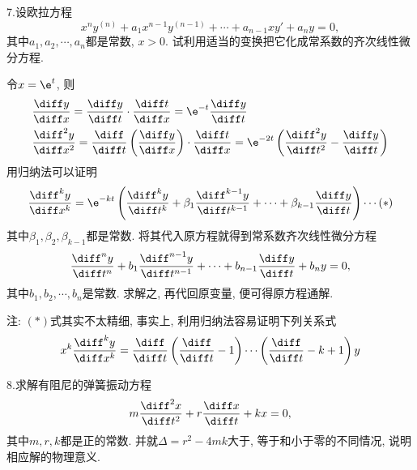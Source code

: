 7.设欧拉方程
\[x^ny^{(n)}+a_1x^{n-1}y^{(n-1)}+\cdots+a_{n-1}xy'+a_ny=0,\]
其中$a_1,a_2,\cdots,a_n$都是常数, $x>0$. 试利用适当的变换把它化成常系数的齐次线性微分方程.

\begin{solve} 
令$x=\e^t$, 则
\[\begin{split}
&\frac{\diff y}{\diff x}=\frac{\diff y}{\diff t}\cdot\frac{\diff t}{\diff x}=\e^{-t}\frac{\diff y}{\diff t}\\
&\frac{\diff^2y}{\diff x^2}=\frac{\diff}{\diff t}\left(\frac{\diff y}{\diff x}\right)\cdot\frac{\diff t}{\diff x}=\e^{-2t}\left(\frac{\diff^2y}{\diff t^2}-\frac{\diff y}{\diff t}\right)
\end{split}\]
用归纳法可以证明
\[\frac{\diff^ky}{\diff x^k}=\e^{-kt}\left(\frac{\diff^ky}{\diff t^k}+\beta_1\frac{\diff^{k-1}y}{\diff t^{k-1}}+\cdots+\beta_{k-1}\frac{\diff y}{\diff t}\right)\cdots(*)\]
其中$\beta_1,\beta_2,\beta_{k-1}$都是常数. 将其代入原方程就得到常系数齐次线性微分方程
\[\frac{\diff^ny}{\diff t^n}+b_1\frac{\diff^{n-1}y}{\diff t^{n-1}}+\cdots+b_{n-1}\frac{\diff y}{\diff t}+b_ny=0,\]
其中$b_1,b_2,\cdots,b_n$是常数. 求解之, 再代回原变量, 便可得原方程通解.
\end{solve}
注: $(*)$式其实不太精细, 事实上, 利用归纳法容易证明下列关系式
\[x^k\frac{\diff^ky}{\diff x^k}=\frac{\diff}{\diff t}\left(\frac{\diff}{\diff t}-1\right)\cdots\left(\frac{\diff}{\diff t}-k+1\right)y\]


8.求解有阻尼的弹簧振动方程
\[m\frac{\diff^2x}{\diff t^2}+r\frac{\diff x}{\diff t}+kx=0,\]
其中$m,r,k$都是正的常数. 并就$\Delta=r^2-4mk$大于, 等于和小于零的不同情况, 说明相应解的物理意义.

